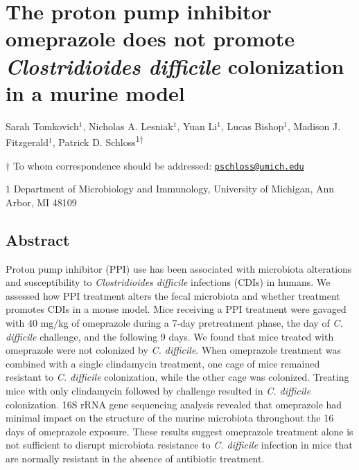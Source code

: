 \documentclass[11pt,]{article}
\title{}
\author{}
\date{}
\begin{document}
\vspace{35mm}

\section{\texorpdfstring{The proton pump inhibitor omeprazole does not
promote \emph{Clostridioides difficile} colonization in a murine
model}{The proton pump inhibitor omeprazole does not promote Clostridioides difficile colonization in a murine model}}\label{the-proton-pump-inhibitor-omeprazole-does-not-promote-clostridioides-difficile-colonization-in-a-murine-model}

\vspace{35mm}

Sarah Tomkovich\({^1}\), Nicholas A. Lesniak\({^1}\), Yuan Li\({^1}\),
Lucas Bishop\({^1}\), Madison J. Fitzgerald\({^1}\), Patrick D.
Schloss\textsuperscript{1\(\dagger\)}

\vspace{40mm}

\(\dagger\) To whom correspondence should be addressed:
\href{mailto:pschloss@umich.edu}{\nolinkurl{pschloss@umich.edu}}

\(1\) Department of Microbiology and Immunology, University of Michigan,
Ann Arbor, MI 48109

\newpage

\linenumbers

\subsection{Abstract}\label{abstract}

Proton pump inhibitor (PPI) use has been associated with microbiota
alterations and susceptibility to \emph{Clostridioides difficile}
infections (CDIs) in humans. We assessed how PPI treatment alters the
fecal microbiota and whether treatment promotes CDIs in a mouse model.
Mice receiving a PPI treatment were gavaged with 40 mg/kg of omeprazole
during a 7-day pretreatment phase, the day of \emph{C. difficile}
challenge, and the following 9 days. We found that mice treated with
omeprazole were not colonized by \emph{C. difficile}. When omeprazole
treatment was combined with a single clindamycin treatment, one cage of
mice remained resistant to \emph{C. difficile} colonization, while the
other cage was colonized. Treating mice with only clindamycin followed
by challenge resulted in \emph{C. difficile} colonization. 16S rRNA gene
sequencing analysis revealed that omeprazole had minimal impact on the
structure of the murine microbiota throughout the 16 days of omeprazole
exposure. These results suggest omeprazole treatment alone is not
sufficient to disrupt microbiota resistance to \emph{C. difficile}
infection in mice that are normally resistant in the absence of
antibiotic treatment.
\end{document}
